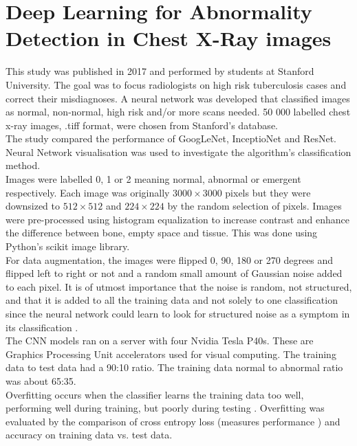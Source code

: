 \section{Deep Learning for Abnormality Detection in Chest X-Ray images \cite{8}}

This study was published in 2017 and performed by students at Stanford University. The goal was to focus radiologists on high risk tuberculosis cases and correct their misdiagnoses. A neural network was developed that classified images as normal, non-normal, high risk and/or more scans needed. 50 000 labelled chest x-ray images, .tiff format, were chosen from Stanford’s database.\newline
\\
The study compared the performance of GoogLeNet, InceptioNet and ResNet. Neural Network visualisation was used to investigate the algorithm’s classification method.\newline
\\
Images were labelled 0, 1 or 2 meaning normal, abnormal or emergent respectively. Each image was originally $3000\times3000$ pixels but they were downsized to $512\times512$ and $224\times224$ by the random selection of pixels. Images were pre-processed using histogram equalization to increase contrast \cite{15} and enhance the difference between bone, empty space and tissue. This was done using Python’s scikit image library.\newline
\\
For data augmentation, the images were flipped 0, 90, 180 or 270 degrees and flipped left to right or not and a random small amount of Gaussian noise added to each pixel. It is of utmost importance that the noise is random, not structured, and that it is added to all the training data and not solely to one classification since the neural network could learn to look for structured noise as a symptom in its classification \cite{16}.\newline
\\
The CNN models ran on a server with four Nvidia Tesla P40s. These are Graphics Processing Unit accelerators used for visual computing. The training data to test data had a 90:10 ratio. The training data normal to abnormal ratio was about 65:35.\newline
\\
Overfitting occurs when the classifier learns the training data too well, performing well during training, but poorly during testing \cite{17}. Overfitting was evaluated by the comparison of cross entropy loss (measures performance \cite{18}) and accuracy on training data vs. test data. \newline
